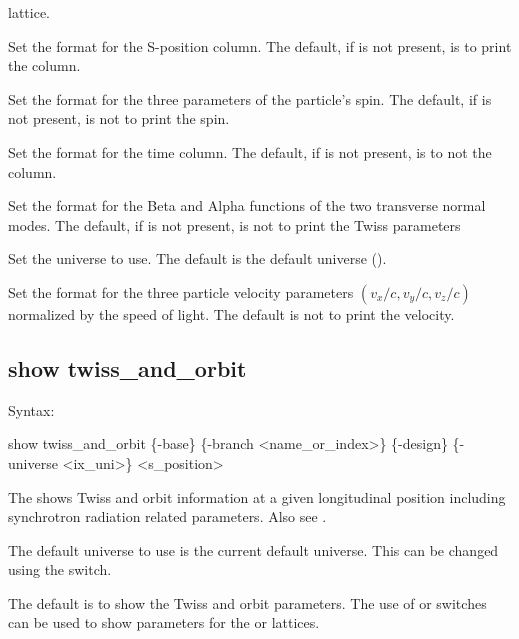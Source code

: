 {{{{{{{{{{\begin{description}
lattice.
%
\item[\vn{\{-s \{<fmt>\}\}}] \Newline
Set the format for the S-position column. The default, if  is not present, is to print the
column.
%
\item[\vn{\{-spin \{<fmt>\}\}}] \Newline
Set the format for the three parameters of the particle's spin. The default, if
 is not present, is not to print the spin.
%
\item[\vn{\{-time \{<fmt>\}\}}] \Newline
Set the format for the time column. The default, if  is not present, is to not the column.
%
\item[\vn{\{-twiss \{<fmt>\}\}}] \Newline
Set the format for the Beta and Alpha functions of the two transverse normal modes. The default, if
 is not present, is not to print the Twiss parameters
%
\item[\vn{\{-universe <ix_uni>\}}] \Newline
Set the universe to use. The default is the default universe ().
%
\item[\vn{\{-velocity \{<fmt>\}\}}] \Newline
Set the format for the three particle velocity parameters $(v_x/c, v_y/c, v_z/c)$ normalized by the
speed of light. The default is not to print the velocity.
%
\end{description}


\subsection{show twiss_and_orbit}
\label{s:show.twiss}

Syntax:
\begin{example}
    show twiss_and_orbit \{-base\} \{-branch <name_or_index>\} \{-design\}
    \{-universe <ix_uni>\} <s_position>
\end{example}

The  shows Twiss and orbit information at a given longitudinal position
 including synchrotron radiation related parameters. Also see .

The default universe to use is the current default universe. This can be changed using the
 switch.

The default is to show the  Twiss and orbit parameters. The use of  or
 switches can be used to show parameters for the  or  lattices.

}}}}}}}}}}
